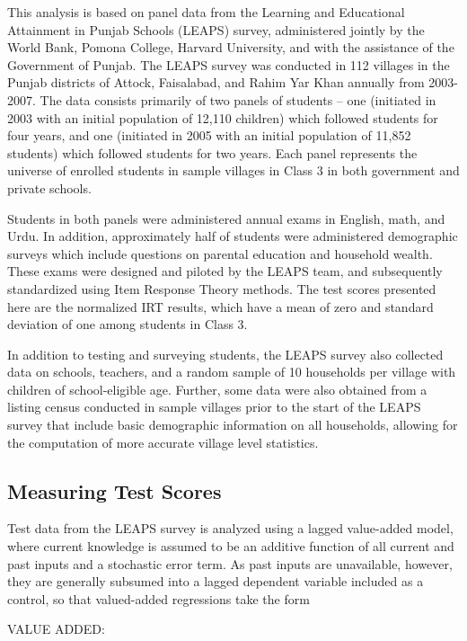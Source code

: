 \documentclass[12pt]{article}
\begin{document}
This analysis is based on panel data from the Learning and Educational Attainment in Punjab Schools (LEAPS) survey, administered jointly by the World Bank, Pomona College, Harvard University, and with the assistance of the Government of Punjab. The LEAPS survey was conducted in 112 villages in the Punjab districts of Attock, Faisalabad, and Rahim Yar Khan annually from 2003-2007. The data consists primarily of two panels of students -- one (initiated in 2003 with an initial population of 12,110 children) which followed students for four years, and one (initiated in 2005 with an initial population of 11,852 students) which followed students for two years. Each panel represents the universe of enrolled students in sample villages in Class 3 in both government and private schools. 

Students in both panels were administered annual exams in English, math, and Urdu. In addition, approximately half of students were administered demographic surveys which include questions on parental education and household wealth. These exams were designed and piloted by the LEAPS team, and subsequently standardized using Item Response Theory methods. The test scores presented here are the normalized IRT results, which have a mean of zero and standard deviation of one among students in Class 3. 

In addition to testing and surveying students, the LEAPS survey also collected data on schools, teachers, and a random sample of 10 households per village with children of school-eligible age. Further, some data were also obtained from a listing census conducted in sample villages prior to the start of the LEAPS survey that include basic demographic information on all households, allowing for the computation of more accurate village level statistics.

\subsection{Measuring Test Scores}\label{}

Test data from the LEAPS survey is analyzed using a lagged value-added model, where current knowledge is assumed to be an additive function of all current and past inputs and a stochastic error term. As past inputs are unavailable, however, they are generally subsumed into a lagged dependent variable included as a control, so that valued-added regressions take the form 

VALUE ADDED: \citep{Gordon:2006wt,McCaffrey:2003vk,Hanushek:2003hz}
\end{document}
